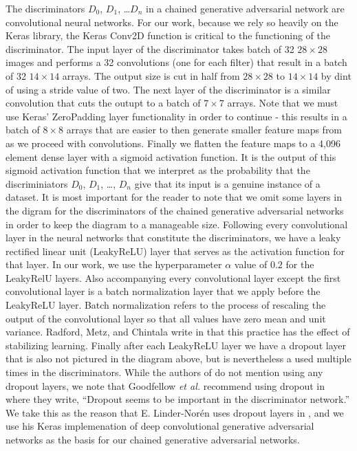 \documentclass[conference]{IEEEtran}
\begin{document}
The discriminators $D_{0}$, $D_{1}$, \ldots $D_{n}$ in a chained generative 
adversarial network are convolutional neural networks.  For our work, because we
rely so heavily on the Keras library, the Keras Conv2D function is critical to
the functioning of the discriminator.  The input layer
of the discriminator takes batch of 32 $28\times28$ images and performs a
32 convolutions (one for each filter) that result in a batch of 32 $14\times14$
arrays.  The output size is cut in half from $28\times28$ to $14\times14$ by
dint of using a stride value of two.  The next layer of the discriminator is a
similar convolution that cuts the outupt to a batch of $7\times7$ arrays.  Note
that we must use Keras' ZeroPadding layer functionality in order to continue -
this results in a batch of $8\times8$ arrays that are easier to then generate
smaller feature maps from as we proceed with convolutions.  Finally we flatten
the feature maps to a 4,096 element dense layer with a sigmoid activation
function.  It is the output of this sigmoid activation function that we
interpret as the probability that the discriminiators $D_{0}$, $D_{1}$, \ldots,
$D_{n}$ give that its input is a genuine instance of a dataset.  It is most
important for the reader to note that we omit some layers in the digram for the
discriminators of the chained generative adversarial networks in order to keep
the diagram to a manageable size.  Following every convolutional layer in the
neural networks that constitute the discriminators, we have a leaky rectified
linear unit (LeakyReLU) layer that serves as the activation function for that
layer.  In our work, we use the hyperparameter $\alpha$ value of $0.2$ for the
LeakyRelU layers.  Also accompanying every convolutional layer except the first
convolutional layer is a batch
normalization layer that we apply before the LeakyReLU layer.  Batch
normalization refers to the process of rescaling the output of the convolutional
layer so that all values have zero mean and unit variance.  Radford, Metz, and
Chintala write in \cite{repLearnDcgan} that this practice has the effect of stabilizing learning.
Finally after each LeakyReLU layer we have a dropout layer that is also not
pictured in the diagram above, but is nevertheless a used multiple times in the
discriminators. While the authors of \cite{repLearnDcgan} do not mention using any
dropout layers, we note that Goodfellow \textit{et al.} recommend using dropout
in \cite{deepLearnBookGenCh} where they write, ``Dropout seems to be important
in the discriminator network.''  We take this as the reason that E.
Linder-Nor\'en uses dropout layers in \cite{kerasdcgan}, and we use his Keras
implemenation of deep convolutional generative adversarial networks as the basis
for our chained generative adversarial networks. 
\end{document}
